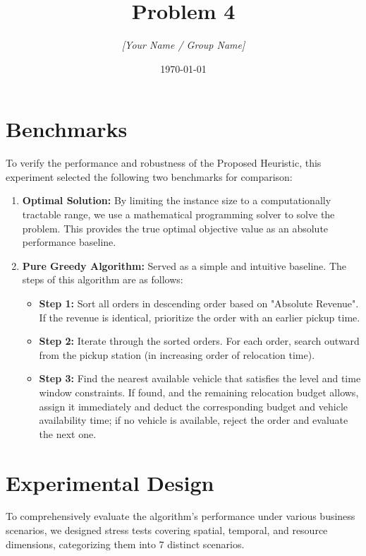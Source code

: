 \documentclass[12pt, a4paper]{article}
\title{\textbf{Problem 4}}
\author{\textit{[Your Name / Group Name]}}
\date{\today}
\begin{document}
\maketitle

\section{Benchmarks}
To verify the performance and robustness of the Proposed Heuristic, this experiment selected the following two benchmarks for comparison:

\begin{enumerate}
    \item \textbf{Optimal Solution:} By limiting the instance size to a computationally tractable range, we use a mathematical programming solver to solve the problem. This provides the true optimal objective value as an absolute performance baseline.
    \item \textbf{Pure Greedy Algorithm:} Served as a simple and intuitive baseline. The steps of this algorithm are as follows:
    \begin{itemize}
        \item \textbf{Step 1:} Sort all orders in descending order based on "Absolute Revenue". If the revenue is identical, prioritize the order with an earlier pickup time.
        \item \textbf{Step 2:} Iterate through the sorted orders. For each order, search outward from the pickup station (in increasing order of relocation time).
        \item \textbf{Step 3:} Find the nearest available vehicle that satisfies the level and time window constraints. If found, and the remaining relocation budget allows, assign it immediately and deduct the corresponding budget and vehicle availability time; if no vehicle is available, reject the order and evaluate the next one.
    \end{itemize}
\end{enumerate}

\section{Experimental Design}
To comprehensively evaluate the algorithm's performance under various business scenarios, we designed stress tests covering spatial, temporal, and resource dimensions, categorizing them into 7 distinct scenarios.
\end{document}
